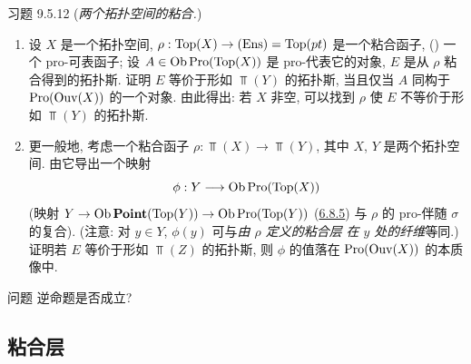 \begin{enonce*}[remark]{习题 9.5.12}
(\emph{两个拓扑空间的粘合.})
\begin{enumerate}
\renewcommand{\theenumi}{\alph{enumi}}
\renewcommand{\labelenumi}{\theenumi)}
\item 设 $X$ 是一个拓扑空间,
$\rho:\operatorname{Top}(X)\rightarrow(\operatorname{Ens})=\operatorname{Top}(pt)$ 是一个粘合函子,
\ie () 一个 pro-可表函子;
设 $A\in\operatorname{Ob}\operatorname{Pro}(\operatorname{Top}(X))$ 是 pro-代表它的对象,
$E$ 是从 $\rho$ 粘合得到的拓扑斯.
证明 $E$ 等价于形如 $\Top(Y)$ 的拓扑斯,
当且仅当 $A$ 同构于 $\operatorname{Pro}(\operatorname{Ouv}(X))$ 的一个对象.
由此\pageoriginale 得出:
若 $X$ 非空, 可以找到 $\rho$ 使 $E$ 不等价于形如 $\Top(Y)$ 的拓扑斯.

\item 更一般地, 考虑一个粘合函子
$\rho:\Top(X)\rightarrow\Top(Y)$,
其中 $X$, $Y$ 是两个拓扑空间.
由它导出一个映射
$$
\phi:Y\longrightarrow \operatorname{Ob} \operatorname{Pro}(\operatorname{Top}(X))
$$
(映射 $Y\rightarrow\operatorname{Ob}\operatorname{\mathbf{Point}}(\operatorname{Top}(Y))\rightarrow\operatorname{Ob}\operatorname{Pro}(\operatorname{Top}(Y))$
(\hyperref[IV.subsubsec6.8.5]{6.8.5}) 与 $\rho$ 的 pro-伴随 $\sigma$ 的复合).
(注意: 对 $y\in Y$, $\phi(y)$ 可与\emph{由 $\rho$ 定义的粘合层}
 \emph{在 $y$ 处的纤维}等同.)
证明若 $E$ 等价于形如 $\Top(Z)$ 的拓扑斯,
则 $\phi$ 的值落在 $\operatorname{Pro}(\operatorname{Ouv}(X))$ 的本质像中.
\end{enumerate}
\end{enonce*}

\begin{enonce*}[remark]{问题}
逆命题是否成立?
\end{enonce*}



\subsection{粘合层}

